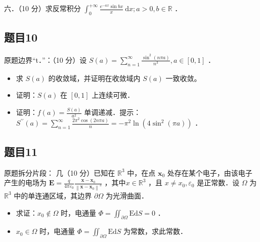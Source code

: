\documentclass{article}
\begin{document}
六．（10 分）求反常积分 \(\int_{0}^{+\infty} \frac{e^{-a x} \sin b x}{x} \mathrm{~d} x ; a>0, b \in \mathbb{R}\) ．

\begin{itemize}
\end{itemize}

\subsection{题目10}
原题边界“t．”：（10 分）设 \(S(a)=\sum_{n=1}^{\infty} \frac{\sin ^{2}(n \pi a)}{n^{3}}, a \in[0,1]\) ．

\begin{itemize}
\item[（1）] 求 \(S(a)\) 的收敛域，并证明在收敛域内 \(S(a)\) 一致收敛。
  \item[（2）] 证明：\(S(a)\) 在 \([0,1]\) 上连续可微．
  \item[（3）] 证明：\(f(a)=\frac{S(a)}{a^{2}}\) 单调递减．提示：\(S^{\prime \prime}(a)=\sum_{n=1}^{\infty} \frac{2 \pi^{2} \cos (2 n \pi a)}{n}=-\pi^{2} \ln \left(4 \sin ^{2}(\pi a)\right)\) ．
\end{itemize}

\subsection{题目11}
原题拆分片段：
几（10 分）已知在 \(\mathbb{R}^{3}\) 中，在点 \(\mathbf{x}_{0}\) 处存在某个电子，由该电子产生的电场为 \(\mathbf{E}=\frac{q}{4 \pi \varepsilon_{0}} \frac{\mathbf{x}-\mathbf{x}_{0}}{\left\|\mathbf{x}-\mathbf{x}_{0}\right\|^{3}}\) ，其中\(x \in \mathbb{R}^{3}\) ，且 \(x \neq x_{0}, \varepsilon_{0}\) 是正常数．设 \(\Omega\) 为 \(\mathbb{R}^{3}\) 中的单连通区域，其边界 \(\partial \Omega\) 为光滑曲面．

\begin{itemize}
  \item[（1）] 求证：\(x_{0} \notin \Omega\) 时，电通量 \(\Phi=\iint_{\partial \Omega} \mathrm{Ed} S=0\) ．
  \item[（2）] \(x_{0} \in \Omega\) 时，电通量 \(\Phi=\iint_{\partial \Omega} \mathrm{Ed} S\) 为常数，求此常数．
\end{itemize}
\end{document}
